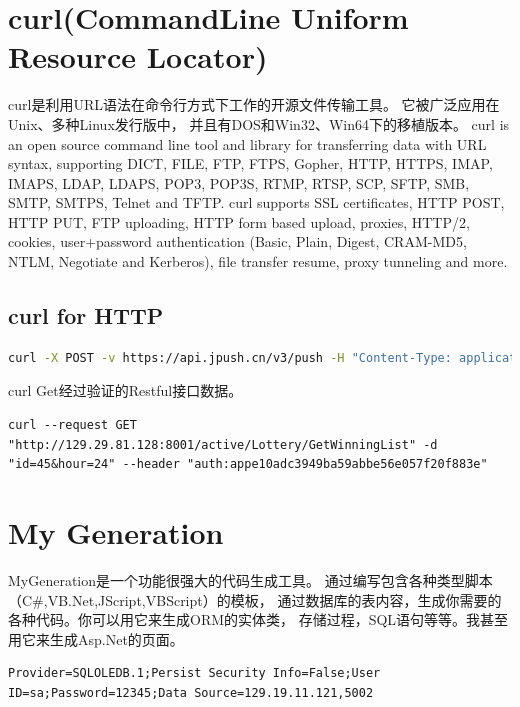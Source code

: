 \documentclass{book}
\begin{document}
\section{curl(CommandLine Uniform Resource Locator)}

curl是利用URL语法在命令行方式下工作的开源文件传输工具。
它被广泛应用在Unix、多种Linux发行版中，
并且有DOS和Win32、Win64下的移植版本。
curl is an open source command line tool and library for transferring data with URL syntax, supporting DICT, FILE, FTP, FTPS, Gopher, HTTP, HTTPS, IMAP, IMAPS, LDAP, LDAPS, POP3, 
POP3S, RTMP, RTSP, SCP, SFTP, SMB, SMTP, SMTPS, Telnet and TFTP. curl supports SSL certificates, 
HTTP POST, HTTP PUT, FTP uploading, HTTP form based upload, proxies, HTTP/2, cookies, 
user+password authentication (Basic, Plain, Digest, CRAM-MD5, NTLM, Negotiate and Kerberos), 
file transfer resume, proxy tunneling and more. 

\subsection{curl for HTTP}

\begin{lstlisting}[language=Bash]
curl -X POST -v https://api.jpush.cn/v3/push -H "Content-Type: application/json" -u "7d431e42dfa6a6d693ac2d04:5e987ac6d2e04d95a9d8f0d1" -d '{"platform":"all","audience":"all","notification":{"alert":"Hi,JPush!"}}'
\end{lstlisting}

curl Get经过验证的Restful接口数据。

\begin{lstlisting}
curl --request GET "http://129.29.81.128:8001/active/Lottery/GetWinningList" -d "id=45&hour=24" --header "auth:appe10adc3949ba59abbe56e057f20f883e"
\end{lstlisting}


\section{My Generation}

MyGeneration是一个功能很强大的代码生成工具。
通过编写包含各种类型脚本（C\#,VB.Net,JScript,VBScript）的模板，
通过数据库的表内容，生成你需要的各种代码。你可以用它来生成ORM的实体类，
存储过程，SQL语句等等。我甚至用它来生成Asp.Net的页面。

\begin{lstlisting}
Provider=SQLOLEDB.1;Persist Security Info=False;User ID=sa;Password=12345;Data Source=129.19.11.121,5002
\end{lstlisting}
\end{document}
